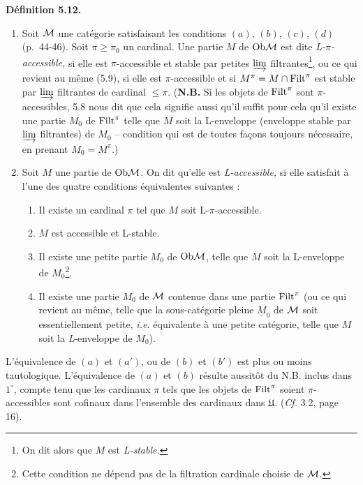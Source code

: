 \textbf{Définition 5.12.}
\begin{enumerate}[label={}]
\item[1)] Soit $\mathcal{M}$ une catégorie satisfaisant les conditions $(a)$, $(b)$, $(c)$, $(d)$ (p.~44-46). Soit $\pi \geq \pi_0$ un cardinal. Une partie $M$ de $\mathrm{Ob}\mathcal{M}$ est dite \textit{L-$\pi$-accessible,} si elle est $\pi$-accessible et stable par petites $\varinjlim$ filtrantes\footnote[24]{On dit alors que $M$ est \textit{L-stable.}}, ou ce qui revient au même (5.9), si elle est $\pi$-accessible et si $M^\pi = M \cap \mathrm{Filt}^\pi$ est stable par $\varinjlim$ filtrantes de cardinal $\leq \pi$. (\textbf{N.B.} Si les objets de $\mathrm{Filt}^\pi$ sont $\pi$-accessibles, 5.8 nous dit que cela signifie aussi qu'il suffit pour cela qu'il existe une partie $M_0$ de $\mathrm{Filt}^\pi$ telle que $M$ soit la L-enveloppe (enveloppe stable par $\varinjlim$ filtrantes) de $M_0$ -- condition qui est de toutes façons toujours nécessaire, en prenant $M_0 = M^\pi$.)
\item[2)] Soit $M$ une partie de $\mathrm{Ob}\mathcal{M}$. On dit qu'elle est \textit{L-accessible,} si elle satisfait à l'une des quatre conditions équivalentes suivantes :
\begin{enumerate}[label={}]
\item[\textit{a})] Il existe un cardinal $\pi$ tel que $M$ soit L-$\pi$-accessible.
\item[\textit{a}$'$)] $M$ est accessible et L-stable.
\item[\textit{b})] Il existe une petite partie $M_0$ de $\mathrm{Ob}\mathcal{M}$, telle que $M$ soit la L-enveloppe de $M_0$\footnote[25]{Cette condition ne dépend pas de la filtration cardinale choisie de $\mathcal{M}$.}.
\item[\textit{b}$'$)] Il existe une partie $M_0$ de $\mathcal{M}$ contenue dans une partie $\mathrm{Filt}^\pi$ (ou ce qui revient au même, telle que la sous-catégorie pleine $\underline{M}_0$ de $\mathcal{M}$ soit essentiellement petite, \textit{i.e.} équivalente à une petite catégorie, telle que $M$ soit la \textit{L}-enveloppe de $M_0$).
\end{enumerate}
\end{enumerate}


L'équivalence de $(a)$ et $(a')$, ou de $(b)$ et $(b')$ est plus ou moins tautologique. L'équivalence de $(a)$ et $(b)$ résulte aussitôt du N.B. inclus dans $1^{\circ}$, compte tenu que les cardinaux $\pi$ tels que les objets de $\mathrm{Filt}^{\pi}$ soient $\pi$-accessibles sont cofinaux dans l'ensemble des cardinaux dans $\mathfrak{U}$. (\textit{Cf.} 3.2, page 16).

